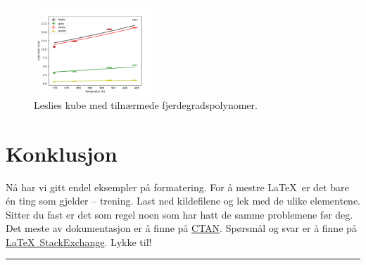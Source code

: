 \begin{figure}
  \centering
  \includegraphics[width=0.4\textwidth]{../code/LC_graphs.pdf}
  \caption{Leslies kube med tilnærmede fjerdegradspolynomer.}
  \label{fig:LeslieResFunc}
\end{figure}

\section{Konklusjon}
Nå har vi gitt endel eksempler på formatering. For å mestre \LaTeX\ er det bare én ting som gjelder -- trening. Last ned kildefilene og lek med de ulike elementene. Sitter du fast er det som regel noen som har hatt de samme problemene før deg. Det meste av dokumentasjon er å finne på \href{http://www.ctan.org/}{CTAN}. Spørsmål og svar er å finne på \href{http://tex.stackexchange.com/}{\LaTeX\ StackExchange}. Lykke til!

\begingroup
\begin{center}
\rule{2cm}{.4pt} %
\end{center}
\makeatletter
{} %
\makeatother


\endgroup


